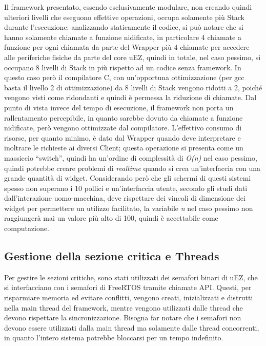 \documentclass[journal]{IEEEtran}
\begin{document}
Il framework presentato, essendo esclusivamente modulare, non creando quindi ulteriori livelli che eseguono effettive operazioni, occupa solamente più Stack durante l'esecuzione: analizzando staticamente il codice, si può notare che si hanno solamente chiamate a funzione nidificate, in particolare 4 chiamate a funzione per ogni chiamata da parte del Wrapper più 4 chiamate per accedere alle periferiche fisiche da parte del core uEZ, quindi in totale, nel caso pessimo, si occupano 8 livelli di Stack in più rispetto ad un codice senza framework. In questo caso però il compilatore C, con un'opportuna ottimizzazione (per gcc basta il livello 2 di ottimizzazione) da 8 livelli di Stack vengono ridotti a 2, poiché vengono visti come ridondanti e quindi è permessa la riduzione di chiamate. Dal punto di vista invece del tempo di esecuzione, il framework non porta un rallentamento percepibile, in quanto sarebbe dovuto da chiamate a funzione nidificate, però vengono ottimizzate dal compilatore. L'effettivo consumo di risorse, per quanto minimo, è dato dal Wrapper quando deve interpretare e inoltrare le richieste ai diversi Client; questa operazione si presenta come un massiccio ``switch'', quindi ha un'ordine di complessità di \textit{O(n)} nel caso pessimo, quindi potrebbe creare problemi di \textit{realtime} quando si crea un'interfaccia con una grande quantità di widget. Considerando però che gli schermi di questi sistemi spesso non superano i 10 pollici e un'interfaccia utente, secondo gli studi dati dall'interazione uomo-macchina, deve rispettare dei vincoli di dimensione dei widget per permettere un utilizzo facilitato, la variabile \textit{n} nel caso pessimo non raggiungerà mai un valore più alto di 100, quindi è accettabile come computazione.

\subsection{Gestione della sezione critica e Threads}

Per gestire le sezioni critiche, sono stati utilizzati dei semafori binari di uEZ, che si interfacciano con i semafori di FreeRTOS tramite chiamate API. Questi, per risparmiare memoria ed evitare conflitti, vengono creati, inizializzati e distrutti nella main thread del framework, mentre vengono utilizzati dalle thread che devono rispettare la sincronizzazione. Bisogna far notare che i semafori non devono essere utilizzati dalla main thread ma solamente dalle thread concorrenti, in quanto l'intero sistema potrebbe bloccarsi per un tempo indefinito.
\end{document}
